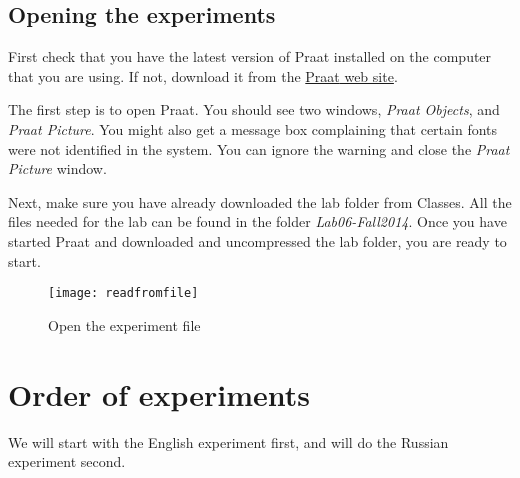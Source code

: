\documentclass{article}
\newcommand{\soft}[1]{\textsf{#1}}
\newcommand{\Praat}{\soft{Praat}}
\newcommand{\labfolder}{\emph{Lab06-Fall2014}}
\begin{document}

\subsection{Opening the experiments}

First check that you have the latest  version of \Praat{}  installed on the computer that you are using. If not, download it from the \href{http://www.praat.org/}{\Praat{} web site}.

The first step is to open \Praat{}. You should see two windows, \emph{\Praat{} Objects}, and \emph{\Praat{} Picture}. You might also get a message box complaining that certain fonts were not identified in the system. You can ignore the warning and close the \emph{\Praat{} Picture} window.

Next, make sure you have already downloaded the lab folder from Classes. All the files needed for the lab can be found in the folder \labfolder{}. Once you have started \Praat{} and downloaded and uncompressed the lab folder, you are ready to start.

\begin{figure}[!tbp]
\caption{Open the experiment file}
\label{readfromfile}
	\begin{center}
		\texttt{[image: readfromfile]}
	\end{center}
\end{figure}

\section{Order of experiments}
%

We will start with the English experiment first, and will do the Russian experiment second.
\end{document}
